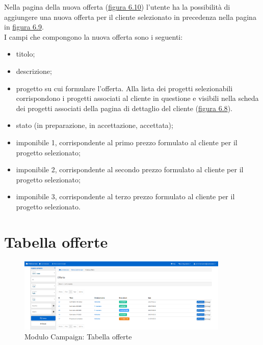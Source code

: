 \noindent Nella pagina della nuova offerta ({\hyperref[fig:nuovaOfferta]{figura 6.10}}) l'utente ha la possibilità di aggiungere una nuova offerta per il cliente selezionato in precedenza nella pagina in {\hyperref[fig:dettaglioCliente2]{figura 6.9}}. \\
I campi che compongono la nuova offerta sono i seguenti:
\begin{itemize}
\item titolo;
\item descrizione;
\item progetto su cui formulare l'offerta. Alla lista dei progetti selezionabili corrispondono i progetti associati al cliente in questione e visibili nella scheda dei progetti associati della pagina di dettaglio del cliente ({\hyperref[fig:dettaglioCliente1]{figura 6.8}}). 
\item stato (in preparazione, in accettazione, accettata);
\item imponibile 1, corrispondente al primo prezzo formulato al cliente per il progetto selezionato;
\item imponibile 2, corrispondente al secondo prezzo formulato al cliente per il progetto selezionato;
\item imponibile 3, corrispondente al terzo prezzo formulato al cliente per il progetto selezionato.
\end{itemize}

\pagebreak

\section{Tabella offerte}
\begin{figure}[!h]
\centering
\includegraphics[width=380px]{../images/UI/11-tabellaOfferte.png}
\caption{Modulo Campaign: Tabella offerte}
\label{fig:tabellaOfferte}
\end{figure}

